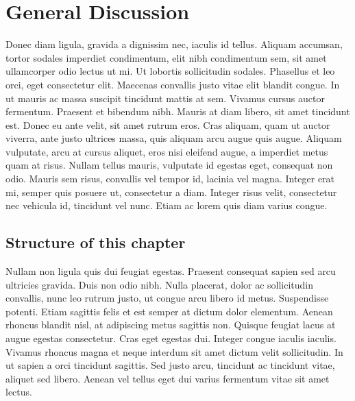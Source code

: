 \chapter{General Discussion}
\label{ch:discussion}

Donec diam ligula, gravida a dignissim nec, iaculis id tellus. Aliquam accumsan, tortor sodales imperdiet condimentum, elit nibh condimentum sem, sit amet ullamcorper odio lectus ut mi. Ut lobortis sollicitudin sodales. Phasellus et leo orci, eget consectetur elit. Maecenas convallis justo vitae elit blandit congue. In ut mauris ac massa suscipit tincidunt mattis at sem. Vivamus cursus auctor fermentum. Praesent et bibendum nibh. Mauris at diam libero, sit amet tincidunt est. Donec eu ante velit, sit amet rutrum eros. Cras aliquam, quam ut auctor viverra, ante justo ultrices massa, quis aliquam arcu augue quis augue. Aliquam vulputate, arcu at cursus aliquet, eros nisi eleifend augue, a imperdiet metus quam at risus. Nullam tellus mauris, vulputate id egestas eget, consequat non odio. Mauris sem risus, convallis vel tempor id, lacinia vel magna. Integer erat mi, semper quis posuere ut, consectetur a diam. Integer risus velit, consectetur nec vehicula id, tincidunt vel nunc. Etiam ac lorem quis diam varius congue.
\section{Structure of this chapter}
\label{ch7:structure}
Nullam non ligula quis dui feugiat egestas. Praesent consequat sapien sed arcu ultricies gravida. Duis non odio nibh. Nulla placerat, dolor ac sollicitudin convallis, nunc leo rutrum justo, ut congue arcu libero id metus. Suspendisse potenti. Etiam sagittis felis et est semper at dictum dolor elementum. Aenean rhoncus blandit nisl, at adipiscing metus sagittis non. Quisque feugiat lacus at augue egestas consectetur. Cras eget egestas dui. Integer congue iaculis iaculis. Vivamus rhoncus magna et neque interdum sit amet dictum velit sollicitudin. In ut sapien a orci tincidunt sagittis. Sed justo arcu, tincidunt ac tincidunt vitae, aliquet sed libero. Aenean vel tellus eget dui varius fermentum vitae sit amet lectus.


